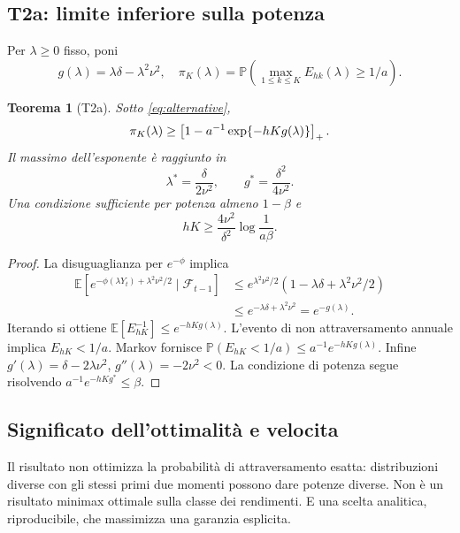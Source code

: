 \documentclass[11pt,a4paper]{article}
\newtheorem{theorem}{Teorema}[section]
\theoremstyle{definition}\newtheorem{definition}[theorem]{Definizione}
\theoremstyle{remark}\newtheorem{remark}[theorem]{Osservazione}
\newcommand{\E}{\mathbb E}\newcommand{\PP}{\mathbb P}\newcommand{\R}{\mathbb R}
\newcommand{\F}{\mathcal F}\newcommand{\W}{\mathcal W}\newcommand{\supp}{\operatorname{supp}}
\begin{document}
\subsection{T2a: limite inferiore sulla potenza}
Per $\lambda\ge0$ fisso, poni
\begin{equation}
 g(\lambda)=\lambda\delta-\lambda^2\nu^2,
 \quad\pi_K(\lambda)=\PP\left(\max_{1\le k\le K}E_{hk}(\lambda)\ge1/a\right).
\end{equation}
\begin{theorem}[T2a]
Sotto \eqref{eq:alternative},
\begin{equation}
 \pi_K(\lambda)\ge\left[1-a^{-1}\exp\{-hK g(\lambda)\}\right]_+.\label{eq:powerfixed}
\end{equation}
Il massimo dell'esponente è raggiunto in
\begin{equation}
 \lambda^*=\frac\delta{2\nu^2},\qquad
 g^*=\frac{\delta^2}{4\nu^2}.\label{eq:lambdastar}
\end{equation}
Una condizione sufficiente per potenza almeno $1-\beta$ e
\begin{equation}
 hK\ge\frac{4\nu^2}{\delta^2}\log\frac1{a\beta}.
\end{equation}
\end{theorem}
\begin{proof}
La disuguaglianza per $e^{-\phi}$ implica
\begin{align*}
 \E[e^{-\phi(\lambda Y_t)+\lambda^2\nu^2/2}\mid\F_{t-1}]
 &\le e^{\lambda^2\nu^2/2}(1-\lambda\delta+\lambda^2\nu^2/2)\\
 &\le e^{-\lambda\delta+\lambda^2\nu^2}=e^{-g(\lambda)}.
\end{align*}
Iterando si ottiene $\E[E_{hK}^{-1}]\le e^{-hKg(\lambda)}$. L'evento di non attraversamento annuale implica $E_{hK}<1/a$. Markov fornisce $\PP(E_{hK}<1/a)\le a^{-1}e^{-hKg(\lambda)}$. Infine $g'(\lambda)=\delta-2\lambda\nu^2$, $g''(\lambda)=-2\nu^2<0$. La condizione di potenza segue risolvendo $a^{-1}e^{-hKg^*}\le\beta$.
\end{proof}

\subsection{Significato dell'ottimalità e velocita}
Il risultato non ottimizza la probabilità di attraversamento esatta: distribuzioni diverse con gli stessi primi due momenti possono dare potenze diverse. Non è un risultato minimax ottimale sulla classe dei rendimenti. E una scelta analitica, riproducibile, che massimizza una garanzia esplicita.
\end{document}
